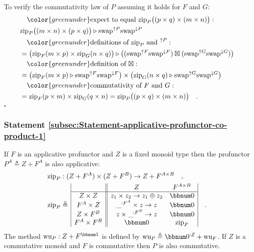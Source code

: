 To verify the commutativity law of $P$ assuming it holds for $F$
and $G$:
\begin{align*}
 & \quad{\color{greenunder}\text{expect to equal }\text{zip}_{P}\big((p\times q)\times(m\times n)\big):}\quad\\
 & \text{zip}_{P}\big((m\times n)\times(p\times q)\big)\triangleright\text{swap}^{\uparrow P}\text{swap}^{\downarrow P}\\
 & \quad{\color{greenunder}\text{definitions of }\text{zip}_{P}\text{ and }^{\uparrow P}:}\quad\\
 & =\big(\text{zip}_{F}(m\times p)\times\text{zip}_{G}(n\times q)\big)\triangleright\big((\text{swap}^{\uparrow F}\text{swap}^{\downarrow F})\boxtimes(\text{swap}^{\uparrow G}\text{swap}^{\downarrow G})\big)\\
 & \quad{\color{greenunder}\text{definition of }\boxtimes:}\quad\\
 & =\big(\text{zip}_{F}(m\times p)\triangleright\text{swap}^{\uparrow F}\text{swap}^{\downarrow F}\big)\times\big(\text{zip}_{G}(n\times q)\triangleright\text{swap}^{\uparrow G}\text{swap}^{\downarrow G}\big)\\
 & \quad{\color{greenunder}\text{commutativity of }F\text{ and }G:}\quad\\
 & =\text{zip}_{F}(p\times m)\times\text{zip}_{G}(q\times n)=\text{zip}_{P}\big((p\times q)\times(m\times n)\big)\quad.
\end{align*}
$\square$

\subsubsection{Statement \label{subsec:Statement-applicative-profunctor-co-product-1}\ref{subsec:Statement-applicative-profunctor-co-product-1}}

If $F$ is an applicative profunctor and $Z$ is a fixed monoid type
then the profunctor $P^{A}\triangleq Z+F^{A}$ is also applicative:
\begin{align*}
 & \text{zip}_{P}:(Z+F^{A})\times(Z+F^{B})\rightarrow Z+F^{A\times B}\quad,\\
 & \text{zip}_{P}\triangleq\,\begin{array}{|c||cc|}
 & Z & F^{A\times B}\\
\hline Z\times Z & z_{1}\times z_{2}\rightarrow z_{1}\oplus z_{2} & \bbnum 0\\
F^{A}\times Z & \_^{:F^{A}}\times z\rightarrow z & \bbnum 0\\
Z\times F^{B} & z\times\_^{:F^{B}}\rightarrow z & \bbnum 0\\
F^{A}\times F^{B} & \bbnum 0 & \text{zip}_{F}
\end{array}\quad.
\end{align*}
The method $\text{wu}_{P}:Z+F^{\bbnum 1}$ is defined by $\text{wu}_{P}\triangleq\bbnum 0^{:Z}+\text{wu}_{F}$.
If $Z$ is a commutative monoid and $F$ is commutative then $P$
is also commutative.

